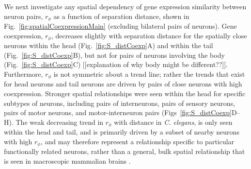 \documentclass[10pt,letterpaper]{article}
\begin{document}

We next investigate any spatial dependency of gene expression similarity between neuron pairs, $r_\phi$ as a function of separation distance, shown in Fig.~\ref{fig:spatialCoexpressionMain} (excluding bilateral pairs of neurons).
Gene coexpression, $r_\phi$, decreases slightly with separation distance for the spatially close neurons within the head (Fig.~\ref{fig:S_distCoexp}A) and within the tail (Fig.~\ref{fig:S_distCoexp}B), but not for pairs of neurons involving the body (Fig.~\ref{fig:S_distCoexp}C) [[explanation of why body might be different??]].
Furthermore, $r_\phi$ is not symmetric about a trend line; rather the trends that exist for head neurons and tail neurons are driven by pairs of close neurons with high coexpression.
Stronger spatial relationships were seen within the head for specific subtypes of neurons, including pairs of interneurons, pairs of sensory neurons, pairs of motor neurons, and motor-interneuron pairs (Figs~\ref{fig:S_distCoexp}D--H).
The weak decreasing trend in $r_\phi$ with distance in \emph{C. elegans}, is only seen within the head and tail, and is primarily driven by a subset of nearby neurons with high $r_\phi$, and may therefore represent a relationship specific to particular functionally related neurons, rather than a general, bulk spatial relationship that is seen in macroscopic mammalian brains \cite{Fulcher:2016ck}.
\end{document}
